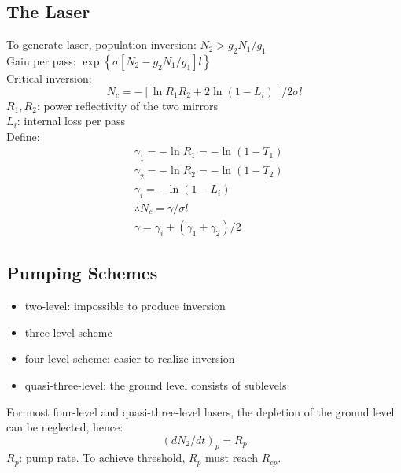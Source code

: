 \documentclass[8pt,a4paper,twocolumn]{article} %
\numberwithin{equation}{section} %
\begin{document}
		\subsection{The Laser} %
		\label{sub:the_laser}
			To generate laser, population inversion: $ N_2> g_2N_1/g_1 $\\
			Gain per pass: $\exp\left\{ \sigma [ N_2- g_2N_1/g_1]l \right\} $\\
			Critical inversion:
			\begin{equation}
				N_c = - [\ln R_1R_2 +2\ln (1-L_i)]/2 \sigma l
			\end{equation}
			$R_1, R_2$: power reflectivity of the two mirrors\\
			$ L_i $: internal loss per pass\\
			Define:
			\begin{align}
				& \gamma_1 = -\ln R_1 = -\ln (1-T_1)\\
				& \gamma_2 = -\ln R_2 = -\ln (1-T_2)\\
				& \gamma_i = -\ln(1-L_i)\\
				&\therefore N_c = \gamma/\sigma l\\
				&\gamma = \gamma_i + (\gamma_1+\gamma_2)/2
			\end{align}
			
		\subsection{Pumping Schemes} %
		\label{sub:pumping_schemes}
			\begin{itemize}
				\item two-level: impossible to produce inversion
				\item three-level scheme
				\item four-level scheme: easier to realize inversion
				\item quasi-three-level: the ground level consists of sublevels
			\end{itemize}

			For most four-level and quasi-three-level lasers, the depletion of the ground level can be neglected, hence:
			\begin{equation}
				(dN_2/dt)_p=R_p
			\end{equation}
			$R_p$: pump rate. To achieve threshold, $R_p$ must reach $R_{cp} $.
\end{document}
